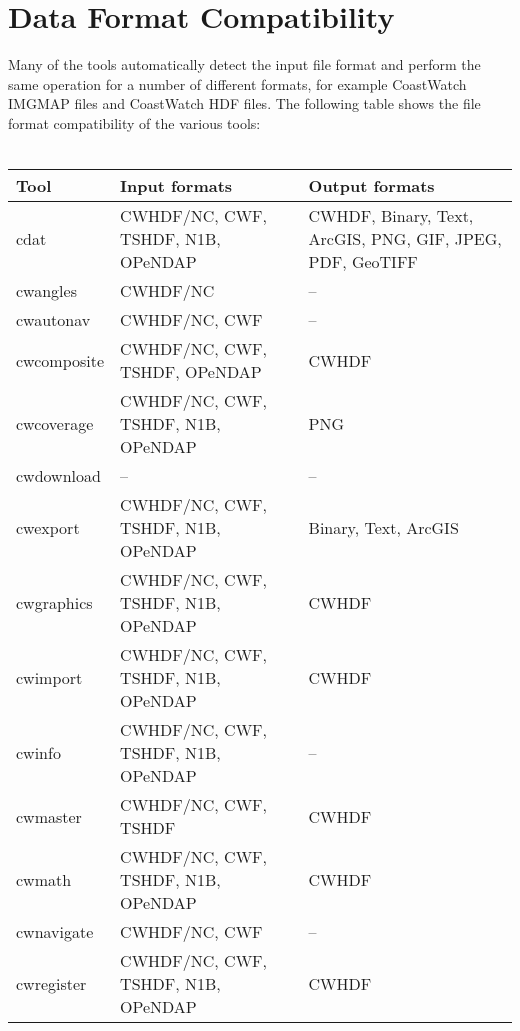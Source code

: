 \chapter{Data Format Compatibility}
\label{compatible}

Many of the tools automatically detect the input file format and
perform the same operation for a number of different formats, for
example CoastWatch IMGMAP files and CoastWatch HDF files. The
following table shows the file format compatibility of the various
tools: \\
\\
\begin{tabular}{|l|p{5cm}|p{5cm}|}
  \hline 

  Tool & Input formats & Output formats \\ \hline 

  cdat & CWHDF/NC, CWF, TSHDF, N1B, OPeNDAP & CWHDF, Binary, Text,
  ArcGIS, PNG, GIF, JPEG, PDF, GeoTIFF \\ \hline

  cwangles & CWHDF/NC & -- \\ \hline

  cwautonav & CWHDF/NC, CWF & -- \\ \hline

  cwcomposite & CWHDF/NC, CWF, TSHDF, OPeNDAP & CWHDF \\ \hline

  cwcoverage & CWHDF/NC, CWF, TSHDF, N1B, OPeNDAP & PNG \\ \hline

  cwdownload & -- & -- \\ \hline

  cwexport & CWHDF/NC, CWF, TSHDF, N1B, OPeNDAP & Binary, Text, ArcGIS \\
  \hline

  cwgraphics & CWHDF/NC, CWF, TSHDF, N1B, OPeNDAP & CWHDF \\ \hline

  cwimport & CWHDF/NC, CWF, TSHDF, N1B, OPeNDAP & CWHDF \\ \hline

  cwinfo & CWHDF/NC, CWF, TSHDF, N1B, OPeNDAP & -- \\ \hline

  cwmaster & CWHDF/NC, CWF, TSHDF & CWHDF \\ \hline

  cwmath & CWHDF/NC, CWF, TSHDF, N1B, OPeNDAP & CWHDF \\ \hline

  cwnavigate & CWHDF/NC, CWF & -- \\ \hline

  cwregister & CWHDF/NC, CWF, TSHDF, N1B, OPeNDAP & CWHDF \\ \hline

\end{tabular}

